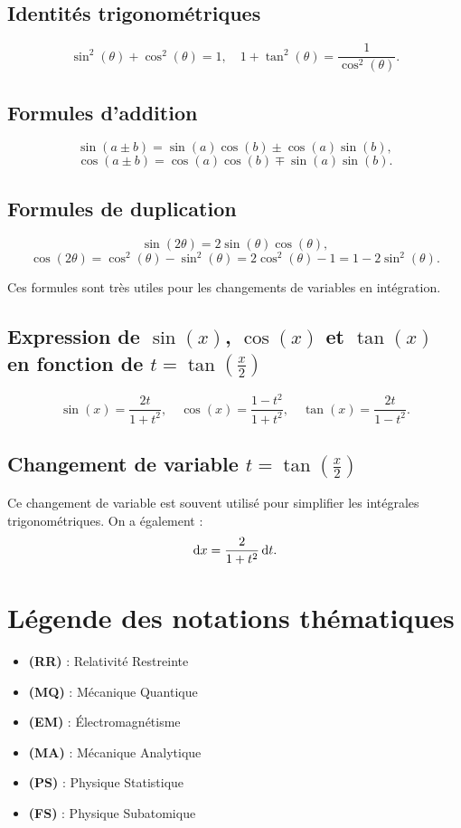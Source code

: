 \documentclass[a4paper,10pt]{report}
\begin{document}
	\subsection{Identités trigonométriques}\label{subsubsec:trigo}
	\[
	\sin^2(\theta) + \cos^2(\theta) = 1, \quad
	1 + \tan^2(\theta) = \frac{1}{\cos^2(\theta)}.
	\]
	
	\subsection*{Formules d'addition}
	\[
	\sin(a \pm b) = \sin(a)\cos(b) \pm \cos(a)\sin(b),
	\]
	\[
	\cos(a \pm b) = \cos(a)\cos(b) \mp \sin(a)\sin(b).
	\]
	
	\subsection*{Formules de duplication}
	\[
	\sin(2\theta) = 2\sin(\theta)\cos(\theta),
	\]
	\[
	\cos(2\theta) = \cos^2(\theta) - \sin^2(\theta) = 2\cos^2(\theta) - 1 = 1 - 2\sin^2(\theta).
	\]

	Ces formules sont très utiles pour les changements de variables en intégration.
	
	\subsection*{Expression de \( \sin(x) \), \( \cos(x) \) et \( \tan(x) \) en fonction de \( t = \tan\left(\frac{x}{2}\right) \)}
	\[
	\sin(x) = \frac{2t}{1 + t^2}, \quad
	\cos(x) = \frac{1 - t^2}{1 + t^2}, \quad
	\tan(x) = \frac{2t}{1 - t^2}.
	\]
	
	\subsection*{Changement de variable \( t = \tan\left(\frac{x}{2}\right) \)}
	Ce changement de variable est souvent utilisé pour simplifier les intégrales trigonométriques. On a également :
	\[
	\text dx = \frac{2}{1 + t^2} \, \text dt.
	\]
	\section{Légende des notations thématiques}
	
	\begin{itemize}
		\item \textbf{(RR)} : Relativité Restreinte
		\item \textbf{(MQ)} : Mécanique Quantique
		\item \textbf{(EM)} : Électromagnétisme
		\item \textbf{(MA)} : Mécanique Analytique
		\item \textbf{(PS)} : Physique Statistique
		\item \textbf{(FS)} : Physique Subatomique
	\end{itemize}
\end{document}
